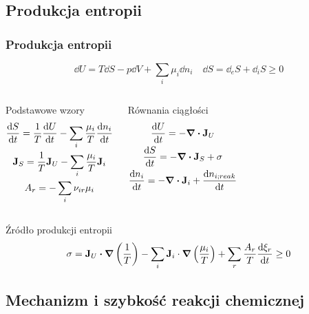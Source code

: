 \documentclass{beamer}
\begin{document}
\subsection{Produkcja entropii}

\begin{frame}
\frametitle{Produkcja entropii}
\begin{equation*}
\dd{U} = T\dd{S} - p\dd{V} + \sum_{i}\mu_{i}\dd{n_{i}} \quad \dd{S} = \dd_{e}S +  \dd_{i}S \geq 0
\end{equation*}
\begin{columns}
\begin{block}{Podstawowe wzory}
\begin{gather*}
\dv{S}{t}=\frac{1}{T}\dv{U}{t}-\sum_{i}\frac{\mu_{i}}{T}\dv{n_{i}}{t} \\
\vb{J}_{S}=\frac{1}{T}\vb{J}_{U}-\sum_{i}\frac{\mu_{i}}{T}\vb{J}_{i} \\
A_{r}=-\sum_{i}\nu_{ir}\mu_{i}
\end{gather*}
\end{block}
\begin{block}{Równania ciągłości}
\begin{gather*}
	\dv{U}{t}=-\div{\vb{J}_{U}} \\
	\dv{S}{t} = -\div{\vb{J}_{S}} + \sigma \\
	\dv{n_{i}}{t}=-\div{\vb{J}_{i}}+\dv{n_{i;reak}}{t}
\end{gather*}
\end{block}
\end{columns}
\begin{block}{Źródło produkcji entropii}
\begin{equation*}
\sigma=\vb{J}_{U}\vdot\grad{\left(\frac{1}{T}\right)}-\sum_{i}\vb{J}_{i}\cdot\grad{\left(\frac{\mu_{i}}{T}\right)}+\sum_{r}\frac{A_{r}}{T}\dv{\xi_{r}}{t}\geq0
\end{equation*}
\end{block}
\end{frame}

\subsection{Mechanizm i szybkość reakcji chemicznej}
\end{document}
